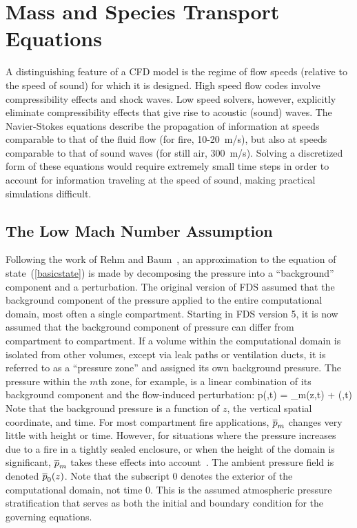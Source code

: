 \chapter{Mass and Species Transport Equations}

A distinguishing feature of a CFD model is the regime of
flow speeds (relative to the speed of sound) for which it is designed. High
speed flow codes involve compressibility effects and shock waves. Low speed
solvers, however, explicitly eliminate compressibility effects that give rise
to acoustic (sound) waves. The Navier-Stokes equations describe the
propagation of information at speeds comparable to that of the fluid flow (for fire, 10-20~m/s),
but also at speeds comparable to that of sound waves (for still air,
300~m/s). Solving a discretized form of these equations would require extremely small
time steps in order to account for information traveling at the speed of sound, making
practical simulations difficult.

\section{The Low Mach Number Assumption}

Following the work of Rehm and Baum~\cite{Rehm:1}, an approximation to the equation of state~(\ref{basicstate}) is made by decomposing the pressure
into a ``background'' component and a perturbation. The original version of FDS assumed that the background component of the pressure
applied to the entire computational domain, most often a single compartment. Starting in FDS version 5, it is now assumed that
the background component of pressure can differ from compartment to compartment. If
a volume within the computational domain is isolated from other volumes, except via leak paths or ventilation ducts, it is referred to as a ``pressure
zone'' and assigned its own background pressure. The pressure within the $m$th zone, for example, is a linear combination
of its background component and the flow-induced perturbation:
\be p(\bx,t) = \bp_m(z,t) + \tp(\bx,t) \ee
Note that the background pressure is a function of $z$, the vertical spatial coordinate, and time. For most
compartment fire applications, $\overline{p}_m$ changes very little with height or time. However, for situations where the pressure
increases due to a fire in a tightly sealed enclosure, or when the height of the domain is significant, $\overline{p}_m$ takes these effects into
account~\cite{Baum:5}. The ambient pressure field is denoted $\overline{p}_0(z)$. Note that the subscript 0 denotes the exterior of the computational domain, not
time 0. This is the assumed atmospheric pressure stratification that serves as both
the initial and boundary condition for the governing equations.

